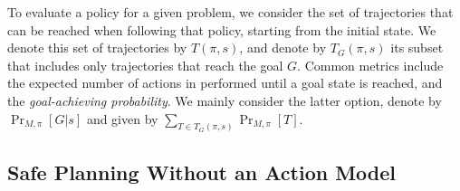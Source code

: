 \documentclass[letterpaper]{article} %
\newcommand{\goal}{\textit{goal}}
\begin{document}





To evaluate a policy for a given problem, we consider the set of trajectories that can be reached when following that policy, starting from the initial state. We denote this set of trajectories by $T(\pi,s)$, and denote by $T_G(\pi,s)$ its subset that includes only trajectories that reach the goal $G$. 
Common metrics include the expected number of actions in performed until a goal state is reached, and the \emph{goal-achieving probability}. 
We mainly consider the latter option, denote by $\Pr_{M,\pi}[G|s]$ and given by $\sum_{T\in T_G(\pi,s)} \Pr_{M,\pi}[T]$. 

















\subsection{Safe Planning Without an Action Model}
\end{document}
